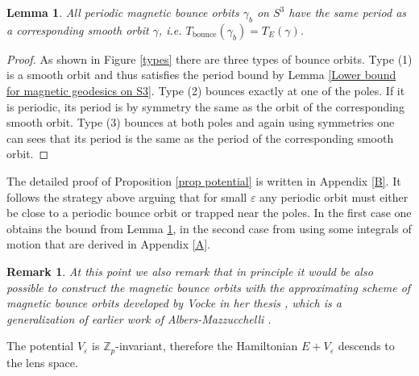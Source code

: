 \documentclass[12pt]{article}
\newtheorem{Lemma}[Definition]{Lemma}
\newtheorem{Remark}[Definition]{Remark}
\newcommand{\Z}{\mathbb{Z}} %
\begin{document}
\begin{Lemma}\label{lemma bounce orbits}
    All periodic magnetic bounce orbits $\gamma_b$ on $S^3$ have the same period as a corresponding smooth orbit $\gamma$, i.e. $T_{\text{bounce}}(\gamma_b)=T_E(\gamma)$.
\end{Lemma}
\begin{proof}
    As shown in Figure \ref{types} there are three types of bounce orbits. Type (1) is a smooth orbit and thus satisfies the period bound by Lemma \ref{Lower bound for magnetic geodesics on S3}. Type (2) bounces exactly at one of the poles. If it is periodic, its period is by symmetry the same as the orbit of the corresponding smooth orbit. Type (3) bounces at both poles and again using symmetries one can sees that its period is the same as the period of the corresponding smooth orbit.
\end{proof}
\noindent
The detailed proof of Proposition \ref{prop potential} is written in Appendix \ref{B}. It follows the strategy above arguing that for small $\varepsilon$ any periodic orbit must either be close to a periodic bounce orbit or trapped near the poles. In the first case one obtains the bound from Lemma \ref{lemma bounce orbits}, in the second case from using some integrals of motion that are derived in Appendix \ref{A}.\begin{Remark}
    At this point we also remark that in principle it would be also possible to construct the magnetic bounce orbits with the approximating scheme of magnetic bounce orbits developed by Vocke in her thesis \cite{V21}, which is a generalization of earlier work of Albers-Mazzucchelli \cite{AM11}. 
\end{Remark}
\noindent
The potential $V_\varepsilon$ is $\Z_p$-invariant, therefore the Hamiltonian $E+V_\varepsilon$ descends to the lens space.
\end{document}
